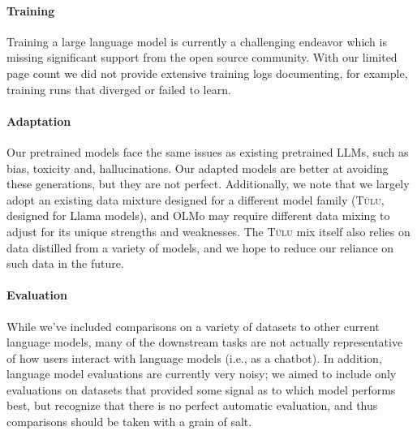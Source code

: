 \documentclass[11pt]{article}
\newcommand{\olmo}{OLMo\xspace}
\newcommand{\tulu}{\textsc{T\"ulu}\xspace}
\begin{document}
\paragraph{Training}
Training a large language model is currently a challenging endeavor which is missing significant support from the open source community. With our limited page count we did not provide extensive training logs documenting, for example, training runs that diverged or failed to learn.

\paragraph{Adaptation}
Our pretrained models face the same issues as existing pretrained LLMs, such as bias, toxicity and, hallucinations. Our adapted models are better at avoiding these generations, but they are not perfect.
Additionally, we note that we largely adopt an existing data mixture designed for a different model family (\tulu, designed for Llama models), and \olmo may require different data mixing to adjust for its unique strengths and weaknesses. The \tulu mix itself also relies on data distilled from a variety of models, and we hope to reduce our reliance on such data in the future.

\paragraph{Evaluation}
While we've included comparisons on a variety of datasets to other current language models, many of the downstream tasks are not actually representative of how users interact with language models (i.e., as a chatbot). In addition, language model evaluations are currently very noisy; we aimed to include only evaluations on datasets that provided some signal as to which model performs best, but recognize that there is no perfect automatic evaluation, and thus comparisons should be taken with a grain of salt. 
\end{document}
